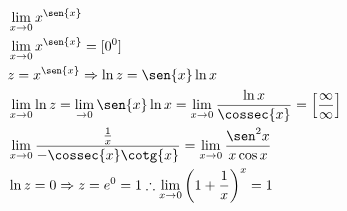 \begin{ex}
\begin{align}
&\lim_{x\rightarrow 0} x^{\sen{x}}\nonumber\\
&\lim_{x\rightarrow 0} x^{\sen{x}}=[0^0]\nonumber\\
&z= x^{\sen{x}} \Rightarrow \ln{z}=\sen{x}\ln{x}\nonumber\\
&\lim_{x\rightarrow 0} \ln{z}=\lim_{\rightarrow 0} \sen{x}\ln{x}=\lim_{x\rightarrow 0} \frac{\ln{x}}{\cossec{x}}=\left[\frac{\infty}{\infty}\right]\nonumber\\
&\lim_{x\rightarrow 0} \frac{\frac{1}{x}}{-\cossec{x}\cotg{x}}=\lim_{x\rightarrow 0} \frac{\sen^2{x}}{x\cos{x}}\nonumber\\
&\ln{z}=0 \Rightarrow z=e^0=1 \therefore \lim_{x\rightarrow 0} \left(1+\frac{1}{x}\right)^{x}=1\nonumber
\end{align}
\end{ex}